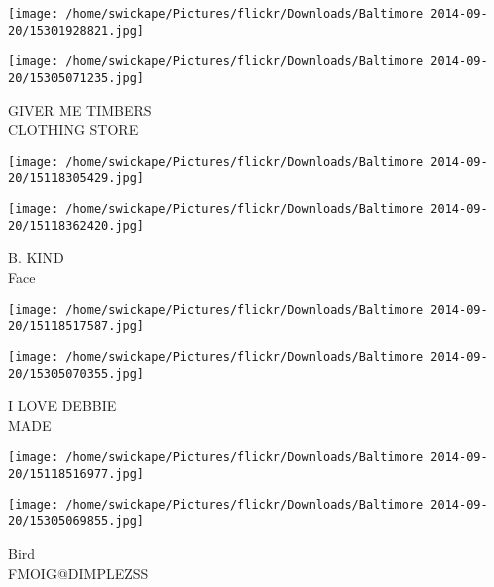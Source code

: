 \documentclass[10pt,letterpaper]{article}
\begin{document}
\texttt{[image: /home/swickape/Pictures/flickr/Downloads/Baltimore 2014-09-20/15301928821.jpg]}

\vspace{0.25in}
\texttt{[image: /home/swickape/Pictures/flickr/Downloads/Baltimore 2014-09-20/15305071235.jpg]}

GIVER ME TIMBERS\\
CLOTHING STORE
\pagebreak

\texttt{[image: /home/swickape/Pictures/flickr/Downloads/Baltimore 2014-09-20/15118305429.jpg]}

\vspace{0.25in}
\texttt{[image: /home/swickape/Pictures/flickr/Downloads/Baltimore 2014-09-20/15118362420.jpg]}

B. KIND\\
Face
\pagebreak

\texttt{[image: /home/swickape/Pictures/flickr/Downloads/Baltimore 2014-09-20/15118517587.jpg]}

\vspace{0.25in}
\texttt{[image: /home/swickape/Pictures/flickr/Downloads/Baltimore 2014-09-20/15305070355.jpg]}

I LOVE DEBBIE\\
MADE
\pagebreak

\texttt{[image: /home/swickape/Pictures/flickr/Downloads/Baltimore 2014-09-20/15118516977.jpg]}

\vspace{0.25in}
\texttt{[image: /home/swickape/Pictures/flickr/Downloads/Baltimore 2014-09-20/15305069855.jpg]}

Bird\\
FMOIG@DIMPLEZSS
\pagebreak
\end{document}
